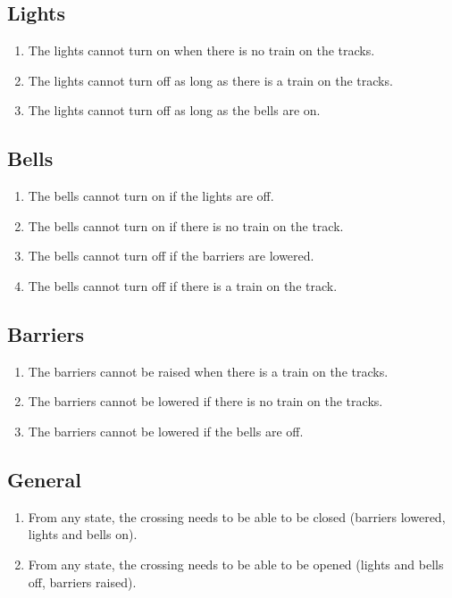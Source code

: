\documentclass[final]{report}
\begin{document}
\subsection{Lights}
	\begin{enumerate}
		\item The lights cannot turn on when there is no train on the tracks.
		\item The lights cannot turn off as long as there is a train on the tracks.
		\item The lights cannot turn off as long as the bells are on.
	\end{enumerate}

\subsection{Bells}
	\begin{enumerate}
		\item The bells cannot turn on if the lights are off.
		\item The bells cannot turn on if there is no train on the track.
		\item The bells cannot turn off if the barriers are lowered.
		\item The bells cannot turn off if there is a train on the track.
	\end{enumerate}

\subsection{Barriers}
	\begin{enumerate}
		\item The barriers cannot be raised when there is a train on the tracks.
		\item The barriers cannot be lowered if there is no train on the tracks.
		\item The barriers cannot be lowered if the bells are off.
	\end{enumerate}
	
\subsection{General}
	\begin{enumerate}
	\item From any state, the crossing needs to be able to be closed (barriers lowered, lights and bells on).
	\item From any state, the crossing needs to be able to be opened (lights and bells off, barriers raised).
	\end{enumerate}
\end{document}
